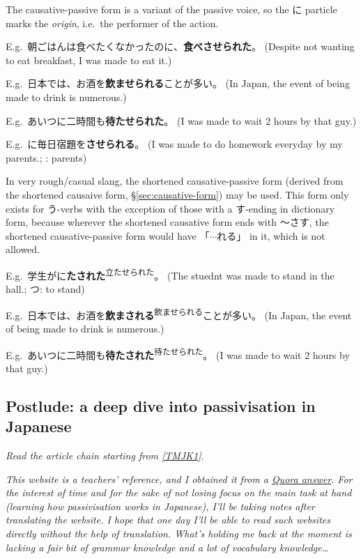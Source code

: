 \documentclass[../nihongo-gakushuu-kyouzai.tex]{subfiles}
\begin{document}
The causative-passive form is a variant of the passive voice, so the に particle marks the \emph{origin}, i.e.\ the performer of the action.


E.g.\ 朝ごはんは食べたくなかったのに、\textbf{食べさせられた}。 (Despite not wanting to eat breakfast, I was made to eat it.)

E.g.\ 日本では、お酒を\textbf{飲ませられる}ことが多い。 (In Japan, the event of being made to drink is numerous.)

E.g.\ あいつに二時間も\textbf{待たせられた}。 (I was made to wait 2 hours by that guy.)

E.g.\ に毎日宿題を\textbf{させられる}。 (I was made to do homework everyday by my parents.; : parents)


In very rough/casual slang, the shortened causative-passive form (derived from the shortened causaive form, \S\ref{sec:causative-form}) may be used. This form only exists for う-verbs with the exception of those with a す-ending in dictionary form, because wherever the shortened causative form ends with 〜さす, the shortened causative-passive form would have 「$\cdots$れる」 in it, which is not allowed.

E.g.\ 学生がに\textbf{たされた}\textsuperscript{立たせられた}。 (The stuednt was made to stand in the hall.; つ: to stand)

E.g.\ 日本では、お酒を\textbf{飲まされる}\textsuperscript{飲ませられる}ことが多い。 (In Japan, the event of being made to drink is numerous.)

E.g.\ あいつに二時間も\textbf{待たされた}\textsuperscript{待たせられた}。 (I was made to wait 2 hours by that guy.)


\subsection{Postlude: a deep dive into passivisation in Japanese} \label{sec:passivisation}
\emph{Read the article chain starting from \href{https://www.tomojuku.com/blog/passive/}{[TMJK1]}.}

\emph{This website is a teachers' reference, and I obtained it from a \href{https://www.quora.com/Can-we-use-\%E8\%87\%AA\%E5\%8B\%95\%E8\%A9\%9E-verbs-in-passive-\%E5\%8F\%97\%E8\%BA\%AB\%E5\%BD\%A2-I-am-learning-Japanese-N4-level-and-it-is-too-difficult-for-me-to-understand-because-in-English-there-is-no-passive-form-for/answer/Badolo}{Quora answer}. For the interest of time and for the sake of not losing focus on the main task at hand (learning how passivisation works in Japanese), I'll be taking notes after translating the website. I hope that one day I'll be able to read such websites directly without the help of translation. What's holding me back at the moment is lacking a fair bit of grammar knowledge and a lot of vocabulary knowledge\dots}
\end{document}
